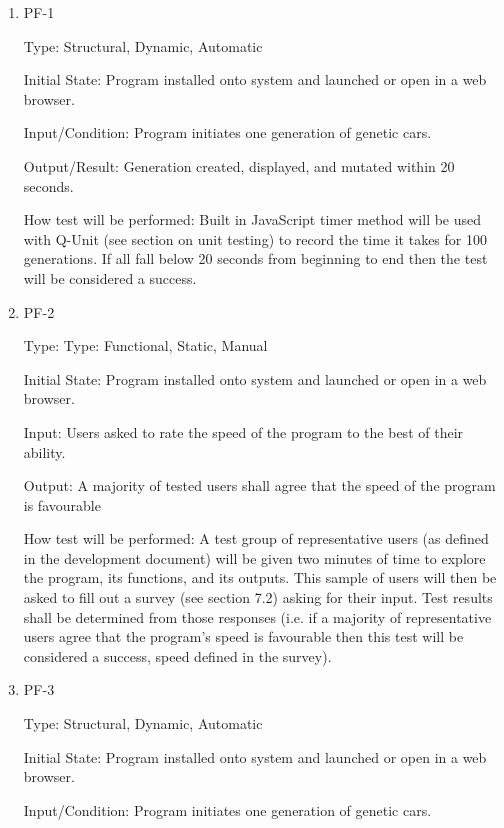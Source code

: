 \documentclass[12pt, titlepage]{article}
\begin{document}
\begin{enumerate}

\item{PF-1\\}

Type: Structural, Dynamic, Automatic
					
Initial State: Program installed onto system and launched or open in a web 
browser.
					
Input/Condition: Program initiates one generation of genetic cars.
					
Output/Result: Generation created, displayed, and mutated within 20 seconds.
					
How test will be performed: Built in JavaScript timer method will be used with 
Q-Unit (see section on unit testing) to record the time it takes for 100 
generations. If all fall below 20 seconds from beginning to end then the test 
will be considered a success.


\item{PF-2\\}

Type: Type: Functional, Static, Manual
					
Initial State: Program installed onto system and launched or open in a web 
browser.
					
Input: Users asked to rate the speed of the program to the best of their 
ability.
					
Output: A majority of tested users shall agree that the speed of the program is 
favourable
					
 How test will be performed: A test group of representative users (as defined in 
the development document) will be given two minutes of time to explore the 
program, its functions, and its outputs. This sample of users will then be asked 
to fill out a survey (see section 7.2) asking for their input. Test results 
shall be determined from those responses (i.e. if a majority of representative 
users agree that the program's speed is favourable then this test will be 
considered a success, speed defined in the survey).

\item{PF-3\\}

Type: Structural, Dynamic, Automatic
					
Initial State: Program installed onto system and launched or open in a web 
browser.
					
Input/Condition: Program initiates one generation of genetic cars.
					

\end{enumerate}
\end{document}
